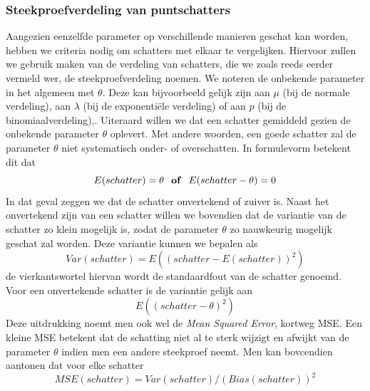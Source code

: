 \documentclass[titlepage]{article}
\numberwithin{equation}{section}
\begin{document}
\subsubsection{Steekproefverdeling van puntschatters}
Aangezien eenzelfde parameter op verschillende manieren geschat kan worden, hebben we criteria nodig om schatters met elkaar te vergelijken. Hiervoor zullen we gebruik maken van de verdeling van schatters, die we zoals reeds eerder vermeld wer, de steekproefverdeling noemen. We noteren de onbekende parameter in het algemeen met $\theta$. Deze kan bijvoorbeeld gelijk zijn aan $\mu$ (bij de normale verdeling), aan $\lambda$ (bij de exponentiële verdeling) of aan $p$ (bij de binomiaalverdeling),. Uiteraard willen we dat een schatter gemiddeld gezien de onbekende parameter $\theta$ oplevert. Met andere woorden, een goede schatter zal de parameter $\theta$ niet systematisch onder- of overschatten. In formulevorm betekent dit dat
\begin{equation}
	E(schatter) = \theta \text{ \textbf{ of } } E(schatter - \theta) = 0
	\label{5.13}
\end{equation}
In dat geval zeggen we dat de schatter onvertekend of zuiver is.\newline\newline
Naast het onvertekend zijn van een schatter willen we bovendien dat de variantie van de schatter zo klein mogelijk is, zodat de parameter $\theta$ zo nauwkeurig mogelijk geschat zal worden. Deze variantie kunnen we bepalen als
\begin{equation*}
	Var(schatter) = E\left((schatter - E(schatter))^2\right)
\end{equation*}
de vierkantswortel hiervan wordt de standaardfout van de schatter genoemd. Voor een onvertekende schatter is de variantie gelijk aan
\begin{equation*}
	E\left( (schatter - \theta)^2\right)
\end{equation*}
Deze uitdrukking noemt men ook wel de \textit{Mean Squared Error}, kortweg MSE. Een kleine MSE betekent dat de schatting niet al te sterk wijzigt en afwijkt van de parameter $\theta$ indien men een andere steekproef neemt. Men kan bovcendien aantonen dat voor elke schatter
\begin{equation*}
	MSE(schatter) = Var(schatter) / (Bias(schatter))^2
\end{equation*}
\end{document}
